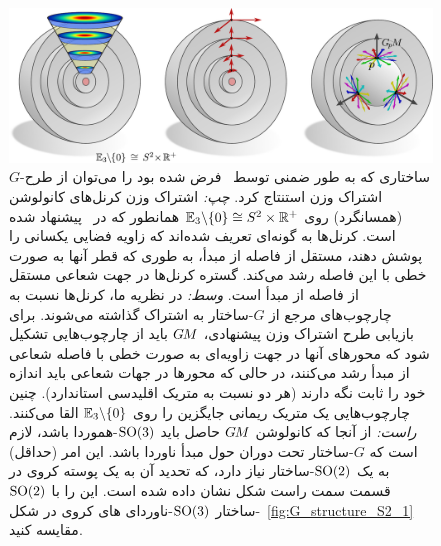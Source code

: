 \begin{figure}
	\centering
	\includegraphics[width=1.\textwidth]{figures/G_structure_R3_no_origin.pdf}
	\hfill
	\caption{\small
		$G$-ساختاری که به طور ضمنی توسط~\citet{ramasinghe2019representation} فرض شده بود را می‌توان از طرح اشتراک وزن استنتاج کرد.
		\emph{چپ:}
		اشتراک وزن کرنل‌های کانولوشن (همسانگرد) روی $\mathbb{E}_3 \backslash \{0\} \cong S^2 \times \mathbb{R}^+$ همانطور که در~\cite{ramasinghe2019representation} پیشنهاد شده است.
		کرنل‌ها به گونه‌ای تعریف شده‌اند که زاویه فضایی یکسانی را پوشش دهند، مستقل از فاصله از مبدأ، به طوری که قطر آنها به صورت خطی با این فاصله رشد می‌کند.
		گستره کرنل‌ها در جهت شعاعی مستقل از فاصله از مبدأ است.
		\emph{وسط:}
		در نظریه ما، کرنل‌ها نسبت به چارچوب‌های مرجع از $G$-ساختار به اشتراک گذاشته می‌شوند.
		برای بازیابی طرح اشتراک وزن پیشنهادی، $G\mkern-1.4muM$ باید از چارچوب‌هایی تشکیل شود که محورهای آنها در جهت زاویه‌ای به صورت خطی با فاصله شعاعی از مبدأ رشد می‌کنند، در حالی که محورها در جهات شعاعی باید اندازه خود را ثابت نگه دارند (هر دو نسبت به متریک اقلیدسی استاندارد).
		چنین چارچوب‌هایی یک متریک ریمانی جایگزین را روی $\mathbb{E}_3 \backslash \{0\}$ القا می‌کنند.
		\emph{راست:}
		از آنجا که کانولوشن $G\mkern-1.4muM$ حاصل باید $\operatorname{SO}(3)$-هموردا باشد، لازم است که $G$-ساختار تحت دوران حول مبدأ ناوردا باشد.
		این امر (حداقل) به یک $\operatorname{SO}(2)$-ساختار نیاز دارد، که تحدید آن به یک پوسته کروی در قسمت سمت راست شکل نشان داده شده است.
		این را با $\operatorname{SO}(2)$-ساختار $\operatorname{SO}(3)$-ناوردای های کروی در شکل~\ref{fig:G_structure_S2_1} مقایسه کنید.
	}
	\label{fig:G_structure_R3_no_origin}
\end{figure}


